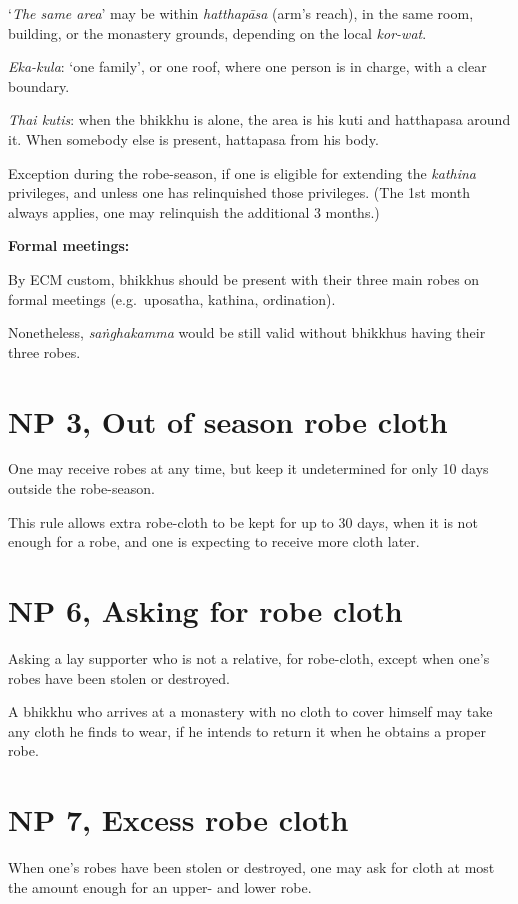 `\emph{The same area}' may be within \emph{hatthapāsa} (arm's reach), in
the same room, building, or the monastery grounds, depending on the
local \emph{kor-wat}.

\emph{Eka-kula}: `one family', or one roof, where one person is in
charge, with a clear boundary.

\emph{Thai kutis}: when the bhikkhu is alone, the area is his kuti and
hatthapasa around it. When somebody else is present, hattapasa from his
body.

Exception during the robe-season, if one is eligible for extending the
\emph{kathina} privileges, and unless one has relinquished those
privileges. (The 1st month always applies, one may relinquish the
additional 3 months.)

\textbf{Formal meetings:}

By ECM custom, bhikkhus should be present with their three main robes on
formal meetings (e.g.~uposatha, kathina, ordination).

Nonetheless, \emph{saṅghakamma} would be still valid without bhikkhus
having their three robes.

\section{NP 3, Out of season robe cloth}

One may receive robes at any time, but keep it undetermined for only 10
days outside the robe-season.

This rule allows extra robe-cloth to be kept for up to 30 days, when it
is not enough for a robe, and one is expecting to receive more cloth
later.

\section{NP 6, Asking for robe cloth}

Asking a lay supporter who is not a relative, for robe-cloth, except
when one's robes have been stolen or destroyed.

A bhikkhu who arrives at a monastery with no cloth to cover himself may
take any cloth he finds to wear, if he intends to return it when he
obtains a proper robe.

\section{NP 7, Excess robe cloth}

When one's robes have been stolen or destroyed, one may ask for cloth at
most the amount enough for an upper- and lower robe.

